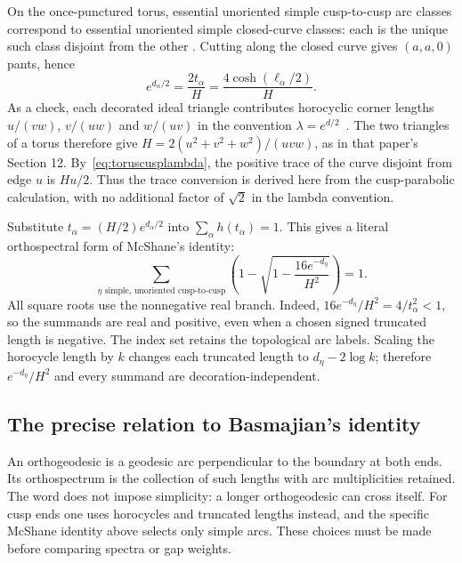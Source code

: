On the once-punctured torus, essential unoriented simple cusp-to-cusp arc
classes correspond to essential unoriented simple closed-curve classes:
each is the unique such class disjoint from the other
\cite[Proposition 14.1(i),(iv)]{Springborn}. Cutting along the
closed curve gives $(a,a,0)$ pants, hence
\begin{equation}
 e^{d_\alpha/2}=\frac{2t_\alpha}{H}
              =\frac{4\cosh(\ell_\alpha/2)}{H}.
 \label{eq:toruscusplambda}
\end{equation}
As a check, each decorated ideal triangle contributes horocyclic corner
lengths $u/(vw)$, $v/(uw)$ and $w/(uv)$ in the convention
$\lambda=e^{d/2}$~\cite[Section 11, equation (30)]{Springborn}.
The two triangles of a torus therefore give
$H=2(u^2+v^2+w^2)/(uvw)$, as in that paper's Section 12.
By~\eqref{eq:toruscusplambda}, the positive trace of the curve disjoint
from edge $u$ is $Hu/2$. Thus the trace conversion is derived here from
the cusp-parabolic calculation, with no additional factor of $\sqrt2$
in the lambda convention.

Substitute $t_\alpha=(H/2)e^{d_\alpha/2}$ into
$\sum_\alpha h(t_\alpha)=1$. This gives a literal orthospectral form of
McShane's identity:
\begin{equation}
 \boxed{
 \sum_{\eta\text{ simple, unoriented cusp-to-cusp}}
 \left(1-\sqrt{1-\frac{16e^{-d_\eta}}{H^2}}\right)=1.}
 \label{eq:cusporthoidentity}
\end{equation}
All square roots use the nonnegative real branch. Indeed,
$16e^{-d_\eta}/H^2=4/t_\alpha^2<1$, so the summands are real and
positive, even when a chosen signed truncated length is negative.
The index set retains the topological arc labels. Scaling the horocycle
length by $k$ changes each truncated length to $d_\eta-2\log k$;
therefore $e^{-d_\eta}/H^2$ and every summand are decoration-independent.

\subsection{The precise relation to Basmajian's identity}

An orthogeodesic is a geodesic arc perpendicular to the boundary
at both ends. Its orthospectrum is the collection of such lengths
with arc multiplicities retained. The word does not impose
simplicity: a longer orthogeodesic can cross itself. For cusp ends
one uses horocycles and truncated lengths instead, and the specific
McShane identity above selects only simple arcs. These choices
must be made before comparing spectra or gap weights.

